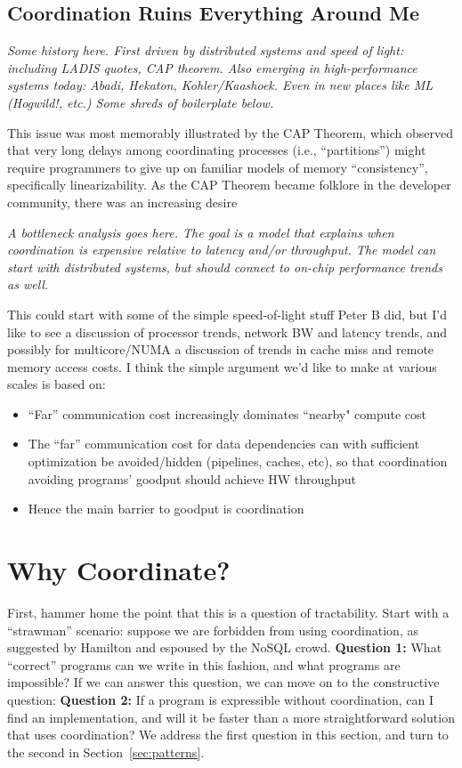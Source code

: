 \documentclass{sig-alternate}
\begin{document}
\subsection{Coordination Ruins Everything Around Me}
\emph{Some history here.  First driven by distributed systems and speed of light: including LADIS quotes, CAP theorem.  Also emerging in high-performance systems today: Abadi, Hekaton, Kohler/Kaashoek.  Even in new places like ML (Hogwild!, etc.)  Some shreds of boilerplate below.}

This issue was most memorably illustrated by the CAP Theorem, which observed that very long delays among coordinating processes (i.e., ``partitions'') might require programmers to give up on familiar models of memory ``consistency'', specifically linearizability.  As the CAP Theorem became folklore in the developer community, there was an increasing desire 


\emph{A bottleneck analysis goes here.  The goal is a model that explains when coordination is expensive relative to latency and/or throughput. The model can start with distributed systems, but should connect to on-chip performance trends as well.}

This could start with some of the simple speed-of-light stuff Peter B did, but I’d like to see a discussion of processor trends, network BW and latency trends, and possibly for multicore/NUMA a discussion of trends in cache miss and remote memory access costs.  I think the simple argument we’d like to make at various scales is based on:
\begin{itemize}
	\item “Far” communication cost increasingly dominates “nearby" compute cost
	\item The “far” communication cost for data dependencies can with sufficient optimization be avoided/hidden (pipelines, caches, etc), so that coordination avoiding programs' goodput should achieve HW throughput
	\item Hence the main barrier to goodput is coordination
\end{itemize}

\section{Why Coordinate?}
First, hammer home the point that this is a question of tractability.  Start with a ``strawman'' scenario: suppose we are forbidden from using coordination, as suggested by Hamilton and espoused by the NoSQL crowd.  \textbf{Question 1:} What ``correct'' programs can we write in this fashion, and what programs are impossible?  If we can answer this question, we can move on to the constructive question:  \textbf{Question 2:} If a program is expressible without coordination, can I find an implementation, and will it be faster than a more straightforward solution that uses coordination?  We address the first question in this section, and turn to the second in Section~\ref{sec:patterns}.
\end{document}
